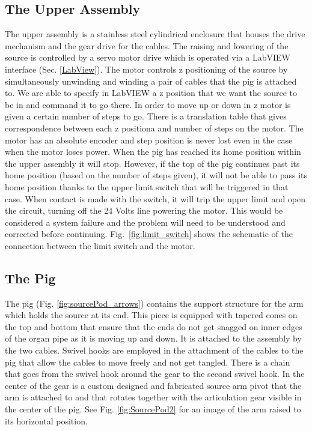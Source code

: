 	
 \subsection{The Upper Assembly} \label{The Upper Assembly}
The upper assembly is a stainless steel cylindrical enclosure that houses the drive mechanism and the gear drive for the cables. The raising and lowering of the source is controlled by a servo motor drive which is operated via a LabVIEW interface (Sec. \ref{LabView}).  The motor controls z positioning of the source by simultaneously unwinding and winding a pair of cables  that the pig is attached to.  We are able to specify in LabVIEW a z position that we want the source to be in and command it to go there.  In order to move up or down in z motor is given a certain number of steps to go. There is a translation table that gives correspondence between each z positiona and number of steps on the motor. The motor has an absolute encoder and step position is never lost even in the case when the motor loses power. When the pig has reached its home position within the upper assembly it will stop.  However, if the top of the pig continues past its home position (based on the number of steps given), it will not be able to pass its home position thanks to the upper limit switch that will be triggered in that case. When contact is made with the switch, it will trip the upper limit and open the circuit, turning off the 24 Volts line powering the motor.  This would be considered a system failure and the problem will need to be understood and corrected before continuing.   
 Fig.~\ref{fig:limit_switch} shows the schematic of the connection between the limit switch and the motor.

	
 \subsection{The Pig} \label{The Pig}
The pig (Fig. \ref{fig:sourcePod_arrows}) contains the support structure for the arm which holds the source at its end.  This piece is equipped with tapered cones on the top and bottom that ensure that the ends do not get snagged on inner edges of the organ pipe as it is moving up and down. It is attached to the assembly by the two cables.  Swivel hooks are employed in the attachment of the cables to the pig that allow the cables to move freely and not get tangled.  There is a chain that goes from the swivel hook around the gear to the second swivel hook. In the center of the gear is a custom designed and fabricated source arm pivot that the arm is attached to and that rotates together with the articulation gear visible in the center of the pig. See Fig. \ref{fig:SourcePod2} for an image of the arm raised to its horizontal position.  
 
